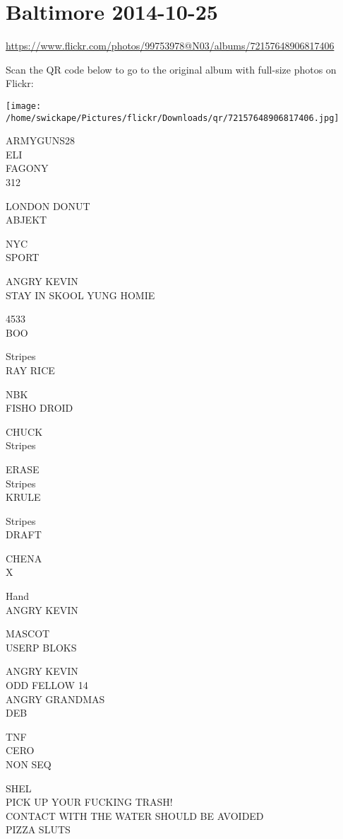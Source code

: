 \documentclass[10pt,letterpaper]{article}
\begin{document}
\section*{Baltimore 2014-10-25}

\url{https://www.flickr.com/photos/99753978@N03/albums/72157648906817406}

Scan the QR code below to go to the original album with full-size photos on Flickr:

\texttt{[image: /home/swickape/Pictures/flickr/Downloads/qr/72157648906817406.jpg]}
\pagebreak

ARMYGUNS28\\
ELI\\
FAGONY\\
312

LONDON DONUT\\
ABJEKT

NYC\\
SPORT

ANGRY KEVIN\\
STAY IN SKOOL YUNG HOMIE

4533\\
BOO

Stripes\\
RAY RICE

NBK\\
FISHO DROID

CHUCK\\
Stripes

ERASE\\
Stripes\\
KRULE

Stripes\\
DRAFT

CHENA\\
X

Hand\\
ANGRY KEVIN

MASCOT\\
USERP BLOKS

ANGRY KEVIN\\
ODD FELLOW 14\\
ANGRY GRANDMAS\\
DEB

TNF\\
CERO\\
NON SEQ

SHEL\\
PICK UP YOUR FUCKING TRASH!\\
CONTACT WITH THE WATER SHOULD BE AVOIDED\\
PIZZA SLUTS
\end{document}
